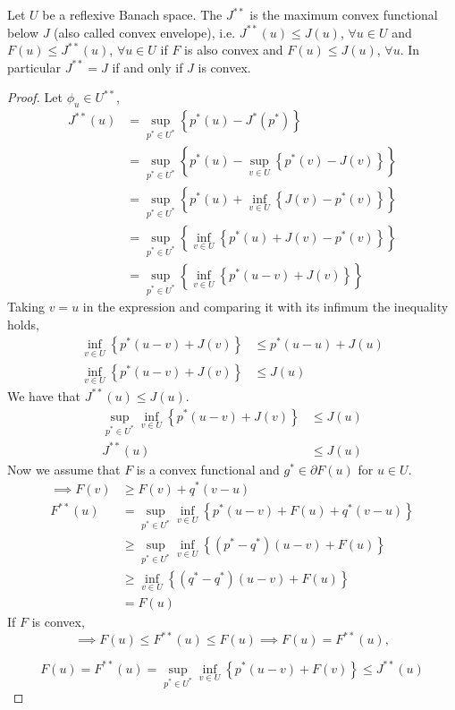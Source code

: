 \begin{theorem}
	Let $U$ be a reflexive Banach space. The $J^{**}$ is the maximum convex functional below $J$ (also called convex envelope), i.e. $J^{**}(u)\leq J(u)$, $\forall u \in U$ and $F(u)\leq J^{**}(u)$, $\forall u \in U$ if $F$ is also convex and $F(u)\leq J(u)$, $\forall u$. In particular $J^{**}=J$ if and only if $J$ is convex.
	\begin{proof}
		Let $\phi_u \in U^{**}$, 
		\begin{align}
			J^{**}(u)&=\sup_{p^*\in U^*} \left\lbrace p^*(u)-J^*(p^*) \right\rbrace\\
					&=\sup_{p^*\in U^*} \left\lbrace p^*(u)-\sup_{v\in U}\left\lbrace p^*(v)-J(v)\right\rbrace\right\rbrace\\
					&=\sup_{p^*\in U^*} \left\lbrace p^*(u)+\inf_{v\in U}\left\lbrace J(v)-p^*(v)\right\rbrace\right\rbrace\\
					&=\sup_{p^*\in U^*} \left\lbrace \inf_{v\in U}\left\lbrace p^*(u)+ J(v)-p^*(v)\right\rbrace\right\rbrace\\
					&=\sup_{p^*\in U^*} \left\lbrace \inf_{v\in U}\left\lbrace p^*(u-v)+J(v)\right\rbrace\right\rbrace
		\end{align}
		Taking $v=u$ in the expression and comparing it with its infimum the inequality holds,
			\begin{align*}
				\inf_{v\in U}\left\lbrace p^* \left(u-v\right)+J(v) \right\rbrace &\leq p^*(u-u)+J(u) \\
				\inf_{v\in U}\left\lbrace p^* \left(u-v\right)+J(v) \right\rbrace &\leq J(u)
			\end{align*}
		We have that $J^{**}(u)\leq J(u)$.
		\begin{align*}
		\sup_{p^* \in U^*}\inf_{v\in U}\left\lbrace p^* \left(u-v\right)+J(v) \right\rbrace &\leq J(u)\\
		J^{**}(u) &\leq J(u)
		\end{align*}
		Now we assume that $F$ is a convex functional and $g^* \in \partial F(u)$ for $u \in U$.
		\begin{align}
			\implies  F(v)&\geq F(v)+q^*(v-u)\\
					  F^{**}(u)& = \sup_{p^* \in U^*} \inf_{v \in U} \left\lbrace p^*(u-v)+F(u)+q^*(v-u)\right\rbrace \\
					  &\geq \sup_{p^* \in U^*} \inf_{v \in U} \left\lbrace \left(p^*-q^*\right)(u-v)+F(u)\right\rbrace\\
					  &\geq \inf_{v \in U} \left\lbrace (q^*-q^*)(u-v)+F(u) \right\rbrace\\
					  &=F(u)
		\end{align}
	If $F$ is convex,
	\begin{equation}
		\implies F(u)\leq F^{**}(u)\leq F(u) \implies F(u)=F^{**}(u),
	\end{equation}

	\begin{equation}
	F(u)=F^{**}(u)=\sup_{p^* \in U^*} \inf_{v \in U} \left\lbrace p^*(u-v)+F(v)\right\rbrace \leq J^{**}(u)
	\end{equation}
	\end{proof}
\end{theorem}

